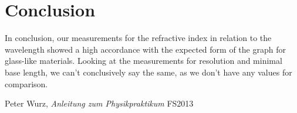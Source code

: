 \documentclass{scrreprt}
\begin{document}
\section{Conclusion}
In conclusion, our measurements for the refractive index in relation to the wavelength showed a high accordance with the expected form of the graph for glass-like materials. Looking at the measurements for resolution and minimal base length, we can't conclusively say the same, as we don't have any values for comparison. 

\begin{thebibliography}{9}

  Peter Wurz,
  \emph{Anleitung zum Physikpraktikum}
  FS2013

\end{thebibliography}
\end{document}
